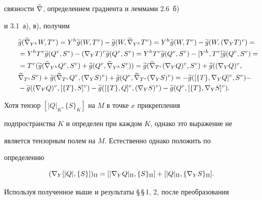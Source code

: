 связности $\widetilde {\nabla}$, определением градиента и леммами 2.6~б)


и 3.1~а), в), получим


\begin{align*}


&\g{g}(\grn{\gh{Y}}W,\gv{T})=\gh{Y}\g{g}(W,\gv{T})-\g{g}(W,


\grn{\gh{Y}}{\gv{T}})=\gh{Y}\g{g}(W,\gv{T})-\g{g}(W,\gv{(\n{Y}{T})})=\\


\qquad&=\gh{Y}\gv{T}\g{g}(\gv{Q},\gv{S})-\gv{(\n{Y}{T})}\g{g}(\gv{Q},\gv{S})=


\gh{Y}\gv{T}\g{g}(\gv{Q},\gv{S})-[\gh{Y},\gv{T}]\g{g}(\gv{Q},\gv{S})=\\


\qquad&=\gv{T}(\g{g}(\grn{\gh{Y}}{\gv{Q}},\gv{S})+\g{g}(\gv{Q},


\grn{\gh{Y}}{\gv{S})})=\g{g}(\grn{\gv{T}}{\gv{(\n{Y}{Q})}},\gv{S})


+\g{g}(\gv{(\n{Y}{Q})},\\


&\grn{\gv{T}}{\gv{S}})+\g{g}(\grn{\gv{T}}{\gv{Q}},


\gv{(\n{Y}{S})})+\g{g}(\gv{Q},\grn{\gv{T}}{\gv{(\n{Y}{S})}})=


-\g{g}(\gv{[\{T\},\n{Y}{Q}]},\gv{S})-\\


\qquad&-\g{g}(\gv{(\n{Y}{Q})},\gv{[\{T\},S]})-\g{g}(\gv{[\{T\},Q]},


\gv{(\n{Y}{S})})-\g{g}(\gv{Q},\gv{[\{T\},\n{Y}{S}]}).


\end{align*}


Хотя тензор $[|Q|_K,\{S\}_K]$ на $M$ в точке $x$ прикрепления


подпространства $K$ и определен при каждом $K$, однако это выражение не


является тензорным полем на $M$. Естественно однако положить по


определению


\begin{equation}




(\n{Y}{[|Q|,\{S\}]})_\Pi=[|\n{Y}{Q}|_\Pi,\{S\}_\Pi]+[|Q|_\Pi,


\{\n{Y}{S}\}_\Pi].


\end{equation}


Используя полученное выше и результаты \S\,\S\,1, 2, после преобразования


